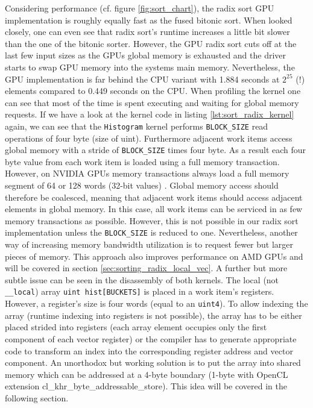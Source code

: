 Considering performance (cf. figure \ref{fig:sort_chart}), the radix sort GPU implementation is roughly equally fast as the fused bitonic sort. When looked closely, one can even see that radix sort's runtime increases a little bit slower than the one of the bitonic sorter. However, the GPU radix sort cuts off at the last few input sizes as the GPUs global memory is exhausted and the driver starts to swap GPU memory into the systems main memory. Nevertheless, the GPU implementation is far behind the CPU variant with 1.884 seconds at $2^{25}$ (!) elements compared to 0.449 seconds on the CPU.
When profiling the kernel one can see that most of the time is spent executing and waiting for global memory requests. If we have a look at the kernel code in listing \ref{lst:sort_radix_kernel} again, we can see that the \lstinline!Histogram! kernel performs \lstinline!BLOCK_SIZE! read operations of four byte (size of uint). Furthermore adjacent work items access global memory with a stride of \lstinline!BLOCK_SIZE! times four byte. As a result each four byte value from each work item is loaded using a full memory transaction. However, on NVIDIA GPUs memory transactions always load a full memory segment of 64 or 128 words (32-bit values) \cite[p.13]{nvidia_opencl_best_practices}. Global memory access should therefore be coalesced, meaning that adjacent work items should access adjacent elements in global memory. In this case, all work items can be serviced in as few memory transactions as possible. However, this is not possible in our radix sort implementation unless the \lstinline!BLOCK_SIZE! is reduced to one. Nevertheless, another way of increasing memory bandwidth utilization is to request fewer but larger pieces of memory. This approach also improves performance on AMD GPUs and will be covered in section \ref{sec:sorting_radix_local_vec}.
A further but more subtle issue can be seen in the disassembly of both kernels. The local (not \lstinline!__local!) array \lstinline!uint hist[BUCKETS]! is placed in a work item's registers. However, a register's size is four words (equal to an \lstinline!uint4!). To allow indexing the array (runtime indexing into registers is not possible), the array has to be either placed strided into registers (each array element occupies only the first component of each vector register) or the compiler has to generate appropriate code to transform an index into the corresponding register address and vector component. An unorthodox but working solution is to put the array into shared memory which can be addressed at a 4-byte boundary (1-byte with OpenCL extension cl\_khr\_byte\_addressable\_store). This idea will be covered in the following section.

